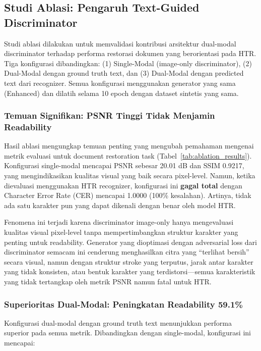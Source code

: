 
\subsection{Studi Ablasi: Pengaruh Text-Guided Discriminator}

Studi ablasi dilakukan untuk memvalidasi kontribusi arsitektur dual-modal discriminator terhadap performa restorasi dokumen yang berorientasi pada HTR. Tiga konfigurasi dibandingkan: (1) Single-Modal (image-only discriminator), (2) Dual-Modal dengan ground truth text, dan (3) Dual-Modal dengan predicted text dari recognizer. Semua konfigurasi menggunakan generator yang sama (Enhanced) dan dilatih selama 10 epoch dengan dataset sintetis yang sama.

\subsubsection{Temuan Signifikan: PSNR Tinggi Tidak Menjamin Readability}

Hasil ablasi mengungkap temuan penting yang mengubah pemahaman mengenai metrik evaluasi untuk document restoration task (Tabel~\ref{tab:ablation_results}). Konfigurasi single-modal mencapai PSNR sebesar 20.01 dB dan SSIM 0.9217, yang mengindikasikan kualitas visual yang baik secara pixel-level. Namun, ketika dievaluasi menggunakan HTR recognizer, konfigurasi ini \textbf{gagal total} dengan Character Error Rate (CER) mencapai 1.0000 (100\% kesalahan). Artinya, tidak ada satu karakter pun yang dapat dikenali dengan benar oleh model HTR.

Fenomena ini terjadi karena discriminator image-only hanya mengevaluasi kualitas visual pixel-level tanpa mempertimbangkan struktur karakter yang penting untuk readability. Generator yang dioptimasi dengan adversarial loss dari discriminator semacam ini cenderung menghasilkan citra yang ``terlihat bersih'' secara visual, namun dengan struktur stroke yang terputus, jarak antar karakter yang tidak konsisten, atau bentuk karakter yang terdistorsi---semua karakteristik yang tidak tertangkap oleh metrik PSNR namun fatal untuk HTR.

\subsubsection{Superioritas Dual-Modal: Peningkatan Readability 59.1\%}

Konfigurasi dual-modal dengan ground truth text menunjukkan performa superior pada semua metrik. Dibandingkan dengan single-modal, konfigurasi ini mencapai:

